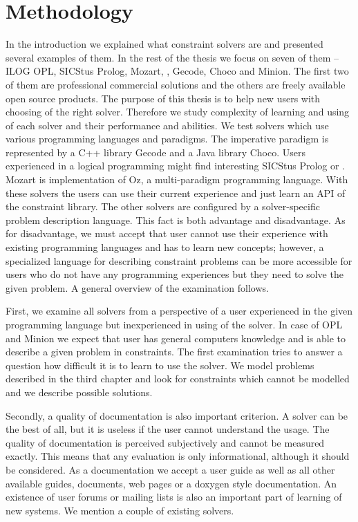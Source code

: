 \chapter{Methodology}
\thispagestyle{myheadings}

In the introduction we explained what constraint solvers are and presented several 
examples of them. In the rest of the thesis we focus on seven of them -- ILOG 
OPL, SICStus Prolog, Mozart, \eclipse, Gecode, Choco and Minion. The first two of them are 
professional commercial solutions and the others are freely available open source 
products. The purpose of this thesis is to help new users with choosing of the right solver. 
Therefore we study complexity of learning and using of each solver and their 
performance and abilities. We test solvers which use various programming languages 
and paradigms. The imperative paradigm is represented by a C++ library Gecode and a Java 
library Choco. Users experienced in a logical programming might find interesting 
SICStus Prolog or \eclipse. Mozart is implementation of Oz, a multi-paradigm 
programming language. With these solvers the users can use their current experience and 
just learn an API of the constraint library. The other solvers are configured by 
a solver-specific problem description language. This fact is both advantage and disadvantage. 
As for disadvantage, we must accept that user cannot use their experience with 
existing programming languages and has to learn new concepts; however, a specialized 
language for describing constraint problems can be more accessible for users who 
do not have any programming experiences but they need to solve the given problem.
A general overview of the examination follows.

First, we examine all solvers from a perspective of a user experienced in the given 
programming language but inexperienced in using of the solver. In case of OPL 
and Minion we expect that user has general computers knowledge and is able 
to describe a given problem in constraints. The first examination tries to answer 
a question how difficult it is to learn to use the solver. We model problems 
described in the third chapter and look for constraints which cannot be modelled 
and we describe possible solutions. 

Secondly, a quality of documentation is also important criterion. A solver can be 
the best of all, but it is useless if the user cannot understand the usage. 
The quality of documentation is perceived subjectively and cannot be measured 
exactly. This means that any evaluation is only informational, although it should be 
considered. As a documentation we accept a user guide as well as all other available 
guides, documents, web pages or a doxygen style documentation. An existence of user 
forums or mailing lists is also an important part of learning of new systems. We 
mention a couple of existing solvers. 

